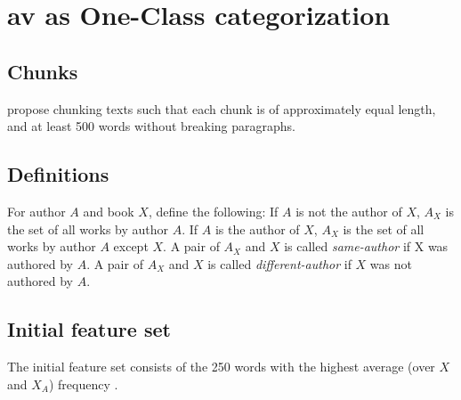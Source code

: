 \section{\ac{av} as One-Class categorization}
\label{sec:av_one_class}



\subsection{Chunks}
\citet{koppel_authorship_2004} propose chunking texts such that each chunk is of approximately equal length, 
and at least 500 words without breaking paragraphs. 

\subsection{Definitions}
For author $A$ and book $X$, \citet{koppel_authorship_2004} define the following:
If $A$ is not the author of $X$, $A_X$ is the set of all works by author $A$.
If $A$ is the author of $X$, $A_X$ is the set of all works by author $A$ except $X$.
A pair of $A_X$ and $X$ is called \emph{same-author} if X was authored by $A$.
A pair of $A_X$ and $X$ is called \emph{different-author} if $X$ was not authored by $A$.

\subsection{Initial feature set}
The initial feature set consists of the 250 words with the highest average (over $X$ and $X_A$) frequency \citep{koppel_authorship_2004}.

